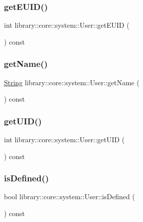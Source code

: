 \subsubsection{\texorpdfstring{getEUID()}{getEUID()}}
{\footnotesize\ttfamily int library\+::core\+::system\+::\+User\+::get\+E\+U\+ID (\begin{DoxyParamCaption}{ }\end{DoxyParamCaption}) const}

\mbox{\label{classlibrary_1_1core_1_1system_1_1_user_a56ec63ee3e0f1d5bdfd9ab1814350c70}} 
\subsubsection{\texorpdfstring{getName()}{getName()}}
{\footnotesize\ttfamily \mbox{\hyperlink{classlibrary_1_1core_1_1types_1_1_string}{String}} library\+::core\+::system\+::\+User\+::get\+Name (\begin{DoxyParamCaption}{ }\end{DoxyParamCaption}) const}

\mbox{\label{classlibrary_1_1core_1_1system_1_1_user_aafe10eadfc78497c3583badac20982e7}} 
\subsubsection{\texorpdfstring{getUID()}{getUID()}}
{\footnotesize\ttfamily int library\+::core\+::system\+::\+User\+::get\+U\+ID (\begin{DoxyParamCaption}{ }\end{DoxyParamCaption}) const}

\mbox{\label{classlibrary_1_1core_1_1system_1_1_user_aba5006465e6c63c1a8693ad559ca53f1}} 
\subsubsection{\texorpdfstring{isDefined()}{isDefined()}}
{\footnotesize\ttfamily bool library\+::core\+::system\+::\+User\+::is\+Defined (\begin{DoxyParamCaption}{ }\end{DoxyParamCaption}) const}

